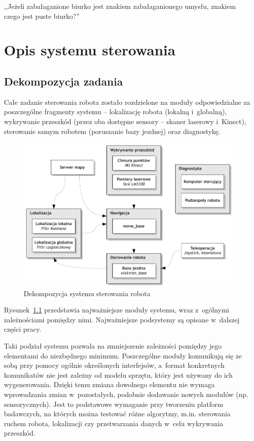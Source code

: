 

\begin{savequote}[70mm]
,,Jeżeli zabałaganione biurko jest znakiem zabałaganionego umysłu, znakiem czego
jest puste biurko?''
\end{savequote}


\chapter{Opis systemu sterowania}
\label{chap:software}

\section{Dekompozycja zadania}

Całe zadanie sterowania robota zostało rozdzielone na moduły odpowiedzialne
za poszczególne fragmenty systemu -- lokalizację robota (lokalną i~globalną),
wykrywanie przeszkód (przez oba dostępne sensory -- skaner laserowy i~Kinect),
sterowanie samym robotem (poruszanie bazy jezdnej) oraz diagnostykę.

\begin{figure}[ht!]
\centering
\includegraphics{../img/decomposition}
\caption{Dekompozycja systemu sterowania robota}
\label{fig:decomposition}
\end{figure}

Rysunek~\ref{fig:decomposition} przedstawia najważniejsze moduły systemu,
wraz z~ogólnymi zależnościami pomiędzy nimi. Najważniejsze podsystemy
są opisane w~dalszej części pracy.

Taki podział systemu pozwala na zmniejszenie zależności pomiędzy jego elementami
do niezbędnego minimum. Poszczególne moduły komunikują się ze sobą przy pomocy
ogólnie określonych interfejsów, a~format konkretnych komunikatów nie jest
zależny od modelu sprzętu, który jest używany do ich wygenerowania. Dzięki temu
zmiana dowolnego elementu nie wymaga wprowadzania zmian w~pozostałych,
podobnie dodawanie nowych modułów (np. sensorycznych). Jest to podstawowe
wymaganie przy tworzeniu platform badawczych, na których można testować różne
algorytmy, m.in. sterowania ruchem robota, lokalizacji czy przetwarzania danych
w~celu wykrywania przeszkód.


